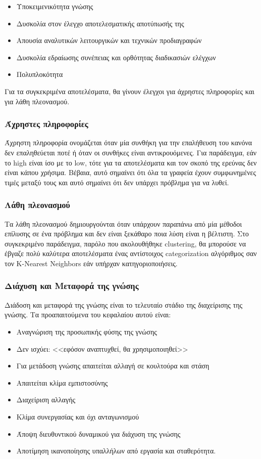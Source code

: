 \begin{itemize}
  \item Υποκειμενικότητα γνώσης
  \item Δυσκολία στον έλεγχο αποτελεσματικής αποτύπωσής της
  \item Απουσία αναλυτικών λειτουργικών και τεχνικών προδιαγραφών
  \item Δυσκολία εδραίωσης συνέπειας και ορθότητας διαδικασιών ελέγχων
  \item Πολυπλοκότητα
\end{itemize}

Για τα συγκεκριμένα αποτελέσματα, θα γίνουν έλεγχοι για άχρηστες πληροφορίες και για λάθη πλεονασμού.

\subsubsection*{Άχρηστες πληροφορίες}

Άχρηστη πληροφορία ονομάζεται όταν μία συνθήκη για την επαλήθευση του κανόνα δεν επαληθεύεται ποτέ ή όταν οι συνθήκες είναι αντικρουόμενες. Για παράδειγμα, εάν το high είναι ίσο με το low, τότε για τα αποτελέσματα και τον σκοπό της ερεύνας δεν είναι κάπου χρήσιμα. Βέβαια, αυτό σημαίνει ότι όλα τα γραφεία έχουν συμφωνημένες τιμές μεταξύ τους και αυτό σημαίνει ότι δεν υπάρχει πρόβλημα για να λυθεί.

\subsubsection*{Λάθη πλεονασμού}

Τα λάθη πλεονασμού δημιουργούνται όταν υπάρχουν παραπάνω από μία μέθοδοι επίλυσης σε ένα πρόβλημα και δεν είναι ξεκάθαρο ποια λύση είναι η βέλτιστη. Στο συγκεκριμένο παράδειγμα, παρόλο που ακολουθήθηκε clustering, θα μπορούσε να έβγαζε πολύ καλύτερα αποτελέσματα ένας αντίστοιχος categorization αλγόριθμος σαν τον K-Nearest Neighbors εάν υπήρχαν κατηγοριοποιήσεις.

\subsubsection{Διάχυση και Μεταφορά της γνώσης}

Διάδοση και μεταφορά της γνώσης είναι το τελευταίο στάδιο της διαχείρισης της γνώσης. Τα προαπαιτούμενα του κεφαλαίου αυτού είναι:

\begin{itemize}
  \item Αναγνώριση της προσωπικής φύσης της γνώσης
  \item Δεν ισχύει: <<εφόσον αναπτυχθεί, θα χρησιμοποιηθεί>>
  \item Για μετάδοση γνώσης απαιτείται αλλαγή σε κουλτούρα και στάση
  \item Απαιτείται κλίμα εμπιστοσύνης
  \item Διαχείριση αλλαγής
  \item Κλίμα συνεργασίας και όχι ανταγωνισμού
  \item Άποψη διευθυντικού δυναμικού για διάχυση της γνώσης
  \item Αποτίμηση ικανοποίησης υπαλλήλων από εργασία και σταθερότητα.
\end{itemize}

